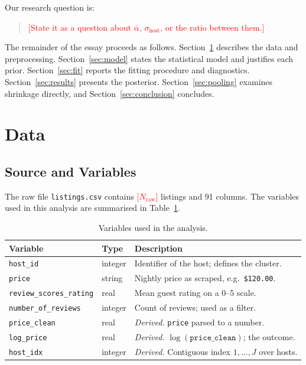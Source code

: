 \documentclass[11pt,a4paper]{article}
\begin{document}
Our research question is:
\begin{quote}
\textcolor{red}{[State it as a question about $\bar{\alpha}$, $\sigma_{\text{host}}$,
or the ratio between them.]}
\end{quote}

The remainder of the essay proceeds as follows. Section~\ref{sec:data} describes
the data and preprocessing. Section~\ref{sec:model} states the statistical model
and justifies each prior. Section~\ref{sec:fit} reports the fitting procedure and
diagnostics. Section~\ref{sec:results} presents the posterior. Section~\ref{sec:pooling}
examines shrinkage directly, and Section~\ref{sec:conclusion} concludes.

\section{Data}\label{sec:data}

\subsection{Source and Variables}

The raw file \texttt{listings.csv} contains
\textcolor{red}{[$N_{\text{raw}}$]} listings and 91 columns. The variables used
in this analysis are summarised in Table~\ref{tab:variables}.

\begin{table}[htbp]
\centering
\caption{Variables used in the analysis.}
\label{tab:variables}
\begin{tabular}{@{}llp{6.5cm}@{}}
\toprule
\textbf{Variable} & \textbf{Type} & \textbf{Description} \\
\midrule
\texttt{host\_id}              & integer & Identifier of the host; defines the cluster. \\
\texttt{price}                 & string  & Nightly price as scraped, e.g.\ \verb|$120.00|. \\
\texttt{review\_scores\_rating}& real    & Mean guest rating on a 0--5 scale. \\
\texttt{number\_of\_reviews}   & integer & Count of reviews; used as a filter. \\
\midrule
\texttt{price\_clean}          & real    & \emph{Derived.} \texttt{price} parsed to a number. \\
\texttt{log\_price}            & real    & \emph{Derived.} $\log(\texttt{price\_clean})$; the outcome. \\
\texttt{host\_idx}             & integer & \emph{Derived.} Contiguous index $1,\dots,J$ over hosts. \\
\bottomrule
\end{tabular}
\end{table}
\end{document}
